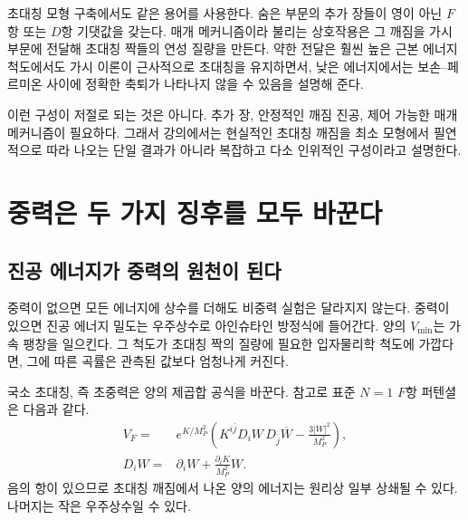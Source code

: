 초대칭 모형 구축에서도 같은 용어를 사용한다. 숨은 부문의 추가 장들이 영이 아닌 \(F\)항 또는 \(D\)항 기댓값을 갖는다. 매개 메커니즘이라 불리는 상호작용은 그 깨짐을 가시 부문에 전달해 초대칭 짝들의 연성 질량을 만든다. 약한 전달은 훨씬 높은 근본 에너지 척도에서도 가시 이론이 근사적으로 초대칭을 유지하면서, 낮은 에너지에서는 보손--페르미온 사이에 정확한 축퇴가 나타나지 않을 수 있음을 설명해 준다.

이런 구성이 저절로 되는 것은 아니다. 추가 장, 안정적인 깨짐 진공, 제어 가능한 매개 메커니즘이 필요하다. 그래서 강의에서는 현실적인 초대칭 깨짐을 최소 모형에서 필연적으로 따라 나오는 단일 결과가 아니라 복잡하고 다소 인위적인 구성이라고 설명한다.

\section{중력은 두 가지 징후를 모두 바꾼다}

\subsection{진공 에너지가 중력의 원천이 된다}

중력이 없으면 모든 에너지에 상수를 더해도 비중력 실험은 달라지지 않는다. 중력이 있으면 진공 에너지 밀도는 우주상수로 아인슈타인 방정식에 들어간다. 양의 \(V_{\min}\)는 가속 팽창을 일으킨다. 그 척도가 초대칭 짝의 질량에 필요한 입자물리학 척도에 가깝다면, 그에 따른 곡률은 관측된 값보다 엄청나게 커진다.

\begin{classroomqa}
\end{classroomqa}

국소 초대칭, 즉 초중력은 양의 제곱합 공식을 바꾼다. 참고로 표준 \(N=1\) \(F\)항 퍼텐셜은 다음과 같다.
\begin{equation}
\begin{aligned}
V_F={}&e^{K/M_P^2}
\left(
K^{i\bar j}D_iW\,D_{\bar j}\overline W
-\frac{3|W|^2}{M_P^2}
\right),\\
D_iW={}&\partial_iW+\frac{\partial_iK}{M_P^2}W.
\end{aligned}
\label{eq:l9-sugra-potential}
\end{equation}
음의 항이 있으므로 초대칭 깨짐에서 나온 양의 에너지는 원리상 일부 상쇄될 수 있다. 나머지는 작은 우주상수일 수 있다.

